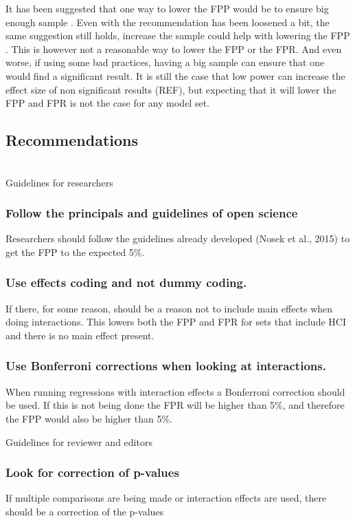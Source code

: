 It has been suggested that one way to lower the FPP would be to ensure big enough sample \citep{Simmons2011}. Even with the recommendation has been loosened a bit, the same suggestion still holds, increase the sample could help with lowering the FPP \cite{s}. This is however not a reasonable way to lower the FPP or the FPR. And even worse, if using some bad practices, having a big sample can ensure that one would find a significant result. It is still the case that low power can increase the effect size of non significant results (REF), but expecting that it will lower the FPP and FPR is not the case for any model set. 

\subsection{Recommendations}
\hfill\\
Guidelines for researchers 
\subsubsection{Follow the principals and guidelines of open science}
Researchers should follow the guidelines already developed (Nosek et al., 2015) to get the FPP to the expected 5\%.
\subsubsection{Use effects coding and not dummy coding.}
If there, for some reason, should be a reason not to include main effects when doing interactions. This lowers both the FPP and FPR for sets that include HCI and there is no main effect present.
\subsubsection{Use Bonferroni corrections when looking at interactions.}
When running regressions with interaction effects a Bonferroni correction should be used. If this is not being done the FPR will be higher than 5\%, and therefore the FPP would also be higher than 5\%.



Guidelines for reviewer and editors

\subsubsection{Look for correction of p-values}
If multiple comparisons are being made or interaction effects are used, there should be a correction of the p-values
